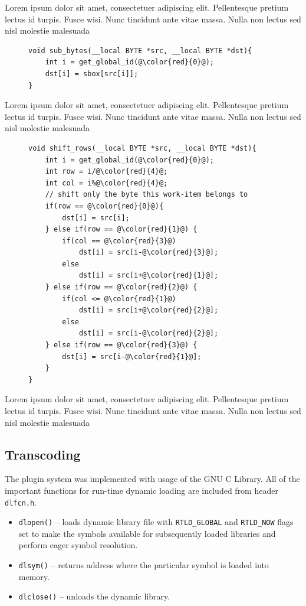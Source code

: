 Lorem ipsum dolor sit amet, consectetuer adipiscing elit. Pellentesque pretium lectus id turpis. Fusce wisi. Nunc tincidunt ante vitae massa. Nulla non lectus sed nisl molestie malesuada

\begin{figure}[H]
\begin{lstlisting}
void sub_bytes(__local BYTE *src, __local BYTE *dst){
    int i = get_global_id(@\color{red}{0}@);
    dst[i] = sbox[src[i]];
}
\end{lstlisting}
\end{figure}

Lorem ipsum dolor sit amet, consectetuer adipiscing elit. Pellentesque pretium lectus id turpis. Fusce wisi. Nunc tincidunt ante vitae massa. Nulla non lectus sed nisl molestie malesuada

\begin{figure}[H]
\begin{lstlisting}
void shift_rows(__local BYTE *src, __local BYTE *dst){   
    int i = get_global_id(@\color{red}{0}@);
    int row = i/@\color{red}{4}@;
    int col = i%@\color{red}{4}@;
    // shift only the byte this work-item belongs to
    if(row == @\color{red}{0}@){
        dst[i] = src[i];
    } else if(row == @\color{red}{1}@) {
        if(col == @\color{red}{3}@)
            dst[i] = src[i-@\color{red}{3}@];
        else
            dst[i] = src[i+@\color{red}{1}@];
    } else if(row == @\color{red}{2}@) {
        if(col <= @\color{red}{1}@)
            dst[i] = src[i+@\color{red}{2}@];
        else
            dst[i] = src[i-@\color{red}{2}@];
    } else if(row == @\color{red}{3}@) {
        dst[i] = src[i-@\color{red}{1}@];
    }
}
\end{lstlisting}
\end{figure}

Lorem ipsum dolor sit amet, consectetuer adipiscing elit. Pellentesque pretium lectus id turpis. Fusce wisi. Nunc tincidunt ante vitae massa. Nulla non lectus sed nisl molestie malesuada

\subsection{Transcoding}
The plugin system was implemented with usage of the GNU C Library. All of the 
important functions for run-time dynamic loading are included from header
\texttt{dlfcn.h}.

\begin{itemize}
\item \texttt{dlopen()} -- loads dynamic library file with \texttt{RTLD\_GLOBAL}
and \texttt{RTLD\_NOW} flags set to make the symbols available for subsequently 
loaded libraries and perform eager symbol resolution. 
\item \texttt{dlsym()} -- returns address where the particular symbol is loaded
into memory.
\item \texttt{dlclose()} -- unloads the dynamic library.
\end{itemize}

